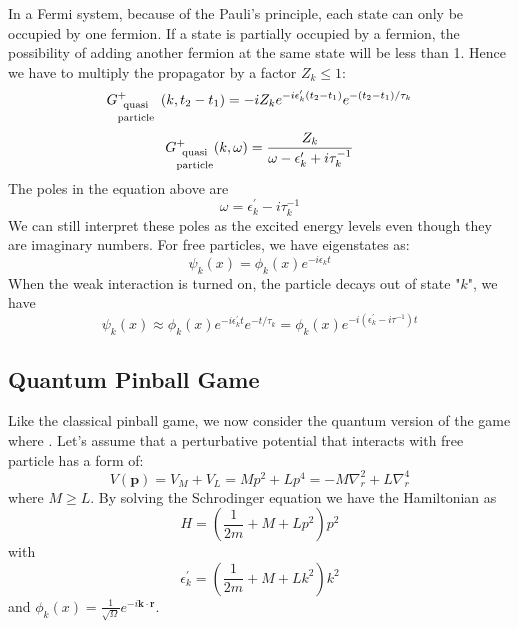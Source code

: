 In a Fermi system, because of the Pauli's principle, each state can only be occupied by one fermion. If a state is partially occupied by a fermion, the possibility of adding another fermion at the same state will be less than 1. Hence we have to multiply the propagator by a factor $Z_k\leq 1$:
\begin{equation}G_{\text {\stackanchor{quasi}{particle} }}^{+}\left(k,t_{2}-t_{1}\right)=-i Z_{k} e^{-i \epsilon_{k}^{\prime}\left(t_{2}-t_{1}\right)} e^{-\left(t_{2}-t_{1}\right) / \tau_{k}}
\label{partial-occ-factor-t}
\end{equation}
\begin{equation}G_{\text {\stackanchor{quasi}{particle}}}^{+}(k, \omega)=\frac{Z_{k}}{\omega-\epsilon_{k}^{\prime}+i \tau_{k}^{-1}}
\label{partial-occ-factor-k}
\end{equation}
The poles in the equation above are 
\begin{equation}
    \omega = \epsilon_k^{\prime}-i\tau_k^{-1}
\end{equation}
We can still interpret these poles as the excited energy levels even though they are imaginary numbers. For free particles, we have eigenstates as:
$$
\psi_k(x)=\phi_k(x)e^{-i\epsilon_k t}
$$
When the weak interaction is turned on, the particle decays out of state "$k$", we have
$$
\psi_k(x)\approx\phi_k(x)e^{-i\epsilon_k^{\prime} t}e^{-t/\tau_k}=\phi_k(x)e^{-i(\epsilon_k^{\prime}-i\tau^{-1})t}
$$

\subsection{Quantum Pinball Game}
Like the classical pinball game, we now consider the quantum version of the game where . Let's assume that a perturbative potential that interacts with free particle has a form of:
\begin{equation}V(\mathbf{p})=V_{M}+V_{L}=M p^{2}+L p^{4}=-M \nabla_{r}^{2}+L \nabla_{r}^{4}\end{equation}
where $M \geqslant L$. By solving the Schrodinger equation we have the Hamiltonian as
$$
H = (\frac{1}{2m}+M+Lp^2)p^2
$$
with 
$$
\epsilon_k^{\prime}= (\frac{1}{2m}+M+Lk^2)k^2
$$
and $\phi_k(x)=\frac{1}{\sqrt{\Omega}}e^{-i\mathbf{k}\cdot\mathbf{r}}$.

